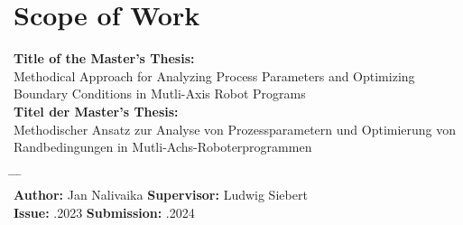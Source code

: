 \chapter*{Scope of Work}


\textbf{Title of the Master's Thesis:}\\
\Large{Methodical Approach for Analyzing Process Parameters and Optimizing Boundary Conditions in Mutli-Axis Robot Programs}\\
\newline
\normalsize{\textbf{Titel der Master's Thesis:}}\\
\Large{Methodischer Ansatz zur Analyse von Prozessparametern und Optimierung von Randbedingungen in Mutli-Achs-Roboterprogrammen}
\normalsize

\begin{tabbing}
	\hspace{7em} 		\= \hspace{13em}			\= \hspace{7em} 		\= \kill
				\> 						\> \\
	\textbf{Author:} \>  Jan Nalivaika	\> \textbf{Supervisor:} 	\>Ludwig Siebert  \\
	\textbf{Issue:} 	.2023	\> \textbf{Submission:} 	.2024
\end{tabbing}

